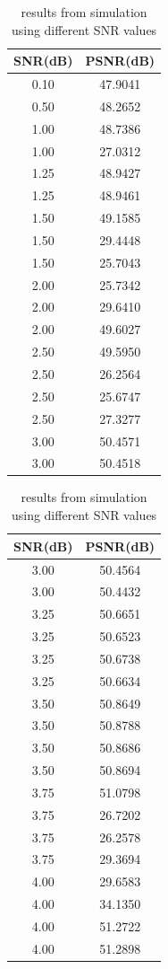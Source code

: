\documentclass{article}
\begin{document}
\begin{table}[h]
	\caption{results from simulation using different SNR values}
	\hspace{0.85cm}
	\begin{minipage}{0.48\textwidth}
		\begin{tabular}{c c}
			\toprule
			SNR(dB) & PSNR(dB)\\
			\midrule
			0.10	& 47.9041	\\
			0.50	& 48.2652	\\
			1.00	& 48.7386	\\
			1.00	& 27.0312	\\
			1.25	& 48.9427	\\
			1.25	& 48.9461	\\
			1.50	& 49.1585	\\
			1.50	& 29.4448	\\
			1.50	& 25.7043	\\
			2.00	& 25.7342	\\
			2.00	& 29.6410	\\
			2.00	& 49.6027	\\
			2.50	& 49.5950	\\
			2.50	& 26.2564	\\
			2.50	& 25.6747	\\
			2.50	& 27.3277	\\
			3.00	& 50.4571	\\
			3.00	& 50.4518	\\
		\end{tabular}
	\end{minipage}
	\begin{minipage}{0.48\textwidth}
		\begin{tabular}{c c}
			\toprule
			SNR(dB) & PSNR(dB)\\
			\midrule
			3.00	& 50.4564	\\
			3.00	& 50.4432	\\
			3.25	& 50.6651	\\
			3.25	& 50.6523	\\
			3.25	& 50.6738	\\
			3.25	& 50.6634	\\
			3.50	& 50.8649	\\
			3.50	& 50.8788	\\
			3.50	& 50.8686	\\
			3.50	& 50.8694	\\
			3.75	& 51.0798	\\
			3.75	& 26.7202	\\
			3.75	& 26.2578	\\
			3.75	& 29.3694	\\
			4.00	& 29.6583	\\
			4.00	& 34.1350	\\
			4.00	& 51.2722	\\
			4.00	& 51.2898	\\
		\end{tabular}
	\end{minipage}
\end{table}
\end{document}
